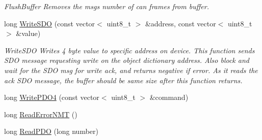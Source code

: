 \begin{DoxyCompactItemize}
\begin{DoxyCompactList}\small\item\em Flush\+Buffer Removes the msgs number of can frames from buffer. \end{DoxyCompactList}\item 
long \hyperlink{classCiA301CommPort_a4d97c27423b2323f8475f6e5c2f91575}{Write\+S\+DO} (const vector$<$ uint8\+\_\+t $>$ \&address, const vector$<$ uint8\+\_\+t $>$ \&value)
\begin{DoxyCompactList}\small\item\em Write\+S\+DO Writes 4 byte value to specific address on device. This function sends S\+DO message requesting write on the object dictionary address. Also block and wait for the S\+DO msg for write ack, and returns negative if error. As it reads the ack S\+DO message, the buffer should be same size after this function returns. \end{DoxyCompactList}\item 
long \hyperlink{classCiA301CommPort_a1faf4f37530e0dd0ae4600cfb0b1d742}{Write\+P\+D\+O4} (const vector$<$ uint8\+\_\+t $>$ \&command)
\item 
long \hyperlink{classCiA301CommPort_a46534ff9e7e2a05a0b4913e4331710e5}{Read\+Error\+N\+MT} ()
\item 
long \hyperlink{classCiA301CommPort_a827f3e594b9f1e57a7b7ccb8a278404a}{Read\+P\+DO} (long number)
\end{DoxyCompactItemize}
